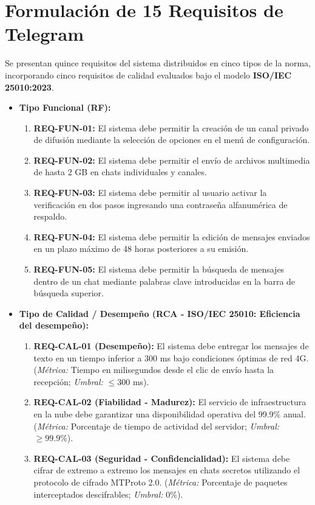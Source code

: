 \documentclass[11pt,a4paper]{article}
\begin{document}
\section{Formulación de 15 Requisitos de Telegram}
Se presentan quince requisitos del sistema distribuidos en cinco tipos de la norma, incorporando cinco requisitos de calidad evaluados bajo el modelo \textbf{ISO/IEC 25010:2023}.

\begin{itemize}
    \item \textbf{Tipo Funcional (RF):}
    \begin{enumerate}
        \item \textbf{REQ-FUN-01:} El sistema debe permitir la creación de un canal privado de difusión mediante la selección de opciones en el menú de configuración.
        \item \textbf{REQ-FUN-02:} El sistema debe permitir el envío de archivos multimedia de hasta 2 GB en chats individuales y canales.
        \item \textbf{REQ-FUN-03:} El sistema debe permitir al usuario activar la verificación en dos pasos ingresando una contraseña alfanumérica de respaldo.
        \item \textbf{REQ-FUN-04:} El sistema debe permitir la edición de mensajes enviados en un plazo máximo de 48 horas posteriores a su emisión.
        \item \textbf{REQ-FUN-05:} El sistema debe permitir la búsqueda de mensajes dentro de un chat mediante palabras clave introducidas en la barra de búsqueda superior.
    \end{enumerate}
    \item \textbf{Tipo de Calidad / Desempeño (RCA - ISO/IEC 25010: Eficiencia del desempeño):}
    \begin{enumerate}
        \item[6.] \textbf{REQ-CAL-01 (Desempeño):} El sistema debe entregar los mensajes de texto en un tiempo inferior a 300 ms bajo condiciones óptimas de red 4G. (\textit{Métrica:} Tiempo en milisegundos desde el clic de envío hasta la recepción; \textit{Umbral:} $\le 300$ ms).
        \item[7.] \textbf{REQ-CAL-02 (Fiabilidad - Madurez):} El servicio de infraestructura en la nube debe garantizar una disponibilidad operativa del 99.9\% anual. (\textit{Métrica:} Porcentaje de tiempo de actividad del servidor; \textit{Umbral:} $\ge 99.9\%$).
        \item[8.] \textbf{REQ-CAL-03 (Seguridad - Confidencialidad):} El sistema debe cifrar de extremo a extremo los mensajes en chats secretos utilizando el protocolo de cifrado MTProto 2.0. (\textit{Métrica:} Porcentaje de paquetes interceptados descifrables; \textit{Umbral:} $0\%$).

\end{enumerate}
\end{itemize}
\end{document}
